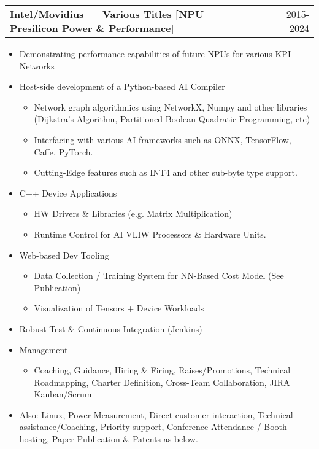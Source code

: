 \documentclass[a4paper,12pt]{article}
\makeatletter
\newenvironment{jobshort}[2]
    {
    \begin{tabularx}{\linewidth}{@{}l X r@{}}
    \textbf{#1} & \hfill &  #2 \\[3.75pt]
    \end{tabularx}
    }
    {
    }
\makeatother
\begin{document}
\begin{jobshort}{Intel/Movidius --- Various Titles [NPU Presilicon Power \& Performance]}{2015-2024}
\begin{itemize}[noitemsep,topsep=0pt,parsep=0pt,partopsep=0pt]
    \item Demonstrating performance capabilities of future NPUs for various KPI Networks
    \item Host-side development of a Python-based AI Compiler
    \begin{itemize}
        \item Network graph algorithmics using NetworkX, Numpy and other libraries (Dijkstra's Algorithm, Partitioned Boolean Quadratic Programming, etc)
        \item Interfacing with various AI frameworks such as ONNX, TensorFlow, Caffe, PyTorch.
        \item Cutting-Edge features such as INT4 and other sub-byte type support.
    \end{itemize}
    \item C++ Device Applications
    \begin{itemize}
        \item HW Drivers \& Libraries (e.g. Matrix Multiplication)
        \item Runtime Control for AI VLIW Processors \& Hardware Units.
    \end{itemize}
    \item Web-based Dev Tooling 
    \begin{itemize}
        \item Data Collection / Training System for NN-Based Cost Model (See Publication)
        \item Visualization of Tensors + Device Workloads
    \end{itemize}
    \item Robust Test \& Continuous Integration (Jenkins)
    \item Management
    \begin{itemize}
        \item Coaching, Guidance, Hiring \& Firing, Raises/Promotions, Technical Roadmapping, Charter Definition, Cross-Team Collaboration, JIRA Kanban/Scrum
    \end{itemize}
    \item Also: Linux, Power Measurement, Direct customer interaction, Technical assistance/Coaching, Priority support, Conference Attendance / Booth hosting, Paper Publication \& Patents as below.
\end{itemize}
\end{jobshort}
\end{document}
